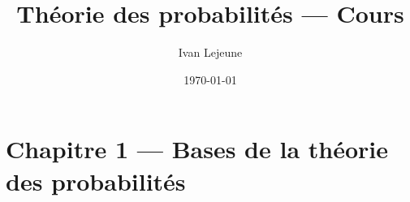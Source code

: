 \documentclass[french,a4paper,10pt]{article}
\title{\color{astral} \sffamily \bfseries Théorie des probabilités --- Cours}
\author{Ivan Lejeune}
\date{\today}
\begin{document}
    \maketitle
    \tableofcontents

    \section*{Chapitre 1 --- Bases de la théorie des probabilités}\label{sec:CH1}
    \setcounter{section}{1}
    
    \newpage
\end{document}
